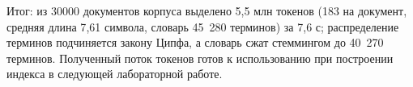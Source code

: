 Итог: из 30000 документов корпуса выделено 5{,}5 млн токенов (183 на документ,
средняя длина 7{,}61 символа, словарь 45~280 терминов) за 7{,}6 с;
распределение терминов подчиняется закону Ципфа, а словарь сжат стеммингом до
40~270 терминов. Полученный поток токенов готов к использованию при построении
индекса в следующей лабораторной работе.

\pagebreak
